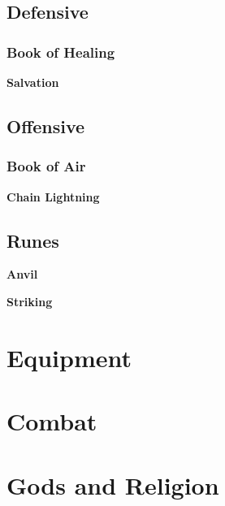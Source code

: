 \documentclass[12pt]{article}
\newcommand{\subsubsubsection}[1]{%
  \vspace{1em} %
  \noindent\textbf{\small #1}\par
  \vspace{0.5em} %
}
\begin{document}
\subsection{Defensive}
\subsubsection{Book of Healing}
\subsubsubsection{Salvation}
\subsection{Offensive}
\subsubsection{Book of Air}
\subsubsubsection{Chain Lightning}
\subsection{Runes}
\subsubsubsection{Anvil}
\subsubsubsection{Striking}
\section{Equipment}
\section{Combat}
\section{Gods and Religion}











\newpage
\printindex
\end{document}
